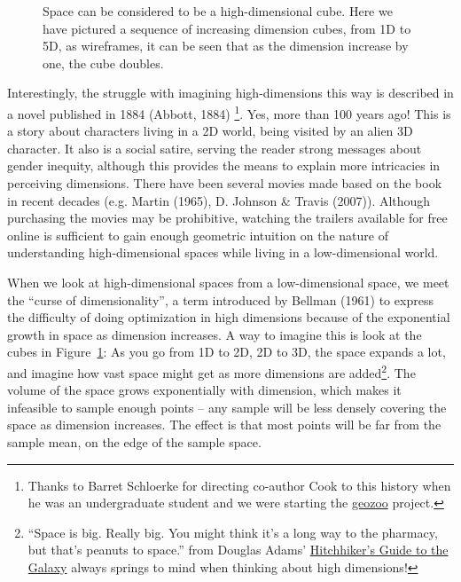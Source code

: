 \documentclass[
  letterpaper,
]{krantz}
\begin{document}

\begin{figure}


\caption{\label{fig-dimension-cubes}Space can be considered to be a
high-dimensional cube. Here we have pictured a sequence of increasing
dimension cubes, from 1D to 5D, as wireframes, it can be seen that as
the dimension increase by one, the cube doubles.}

\end{figure}%

Interestingly, the struggle with imagining high-dimensions this way is
described in a novel published in 1884 (Abbott, 1884) \footnote{Thanks
  to Barret Schloerke for directing co-author Cook to this history when
  he was an undergraduate student and we were starting the
  \href{http://schloerke.com/geozoo/}{geozoo} project.}. Yes, more than
100 years ago! This is a story about characters living in a 2D world,
being visited by an alien 3D character. It also is a social satire,
serving the reader strong messages about gender inequity, although this
provides the means to explain more intricacies in perceiving dimensions.
There have been several movies made based on the book in recent decades
(e.g. Martin (1965), D. Johnson \& Travis (2007)). Although purchasing
the movies may be prohibitive, watching the trailers available for free
online is sufficient to gain enough geometric intuition on the nature of
understanding high-dimensional spaces while living in a low-dimensional
world.

When we look at high-dimensional spaces from a low-dimensional space, we
meet the ``curse of dimensionality'', a term introduced by Bellman
(1961) to express the difficulty of doing optimization in high
dimensions because of the exponential growth in space as dimension
increases. A way to imagine this is look at the cubes in
Figure~\ref{fig-dimension-cubes}: As you go from 1D to 2D, 2D to 3D, the
space expands a lot, and imagine how vast space might get as more
dimensions are added\footnote{``Space is big. Really big. You might
  think it's a long way to the pharmacy, but that's peanuts to space.''
  from Douglas Adams'
  \href{https://en.wikipedia.org/wiki/The_Hitchhiker\%27s_Guide_to_the_Galaxy\#Stage_shows}{Hitchhiker's
  Guide to the Galaxy} always springs to mind when thinking about high
  dimensions!}. The volume of the space grows exponentially with
dimension, which makes it infeasible to sample enough points -- any
sample will be less densely covering the space as dimension increases.
The effect is that most points will be far from the sample mean, on the
edge of the sample space.
\end{document}
